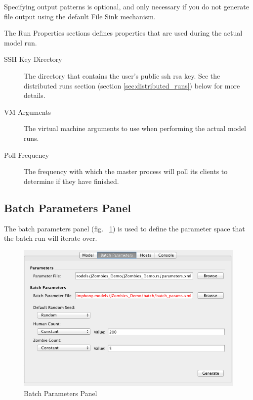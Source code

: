 \documentclass[11pt]{amsart}
\begin{document}
Specifying output patterns is optional, and only necessary if you do not generate file output using the default File Sink mechanism.

The Run Properties sections defines properties that are used during the actual model run.

\begin{description}
\item[SSH Key Directory] The directory that contains the user's public ssh rsa key. See the distributed runs section (section \ref{sec:distributed_runs}) below for more details.
\item[VM Arguments] The virtual machine arguments to use when performing the actual model runs.
\item[Poll Frequency] The frequency with which the master process will poll its clients to determine if they have finished.\end{description}

\subsection{Batch Parameters Panel}
The batch parameters panel (fig. ~\ref{fig:batch_params})  is used to define the parameter space that the batch run will iterate over.

\begin{figure}[h]
\begin{center}
\vspace{.2in}
\centerline {
\includegraphics[width=6in]{images/batch_params_panel.png}
}
\caption{Batch Parameters Panel}
\label{fig:batch_params}
\end{center}
\end{figure}
\end{document}

